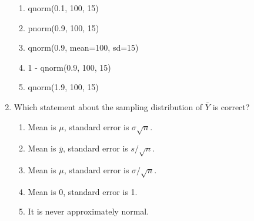 \documentclass{article}
\begin{document}
\begin{enumerate}
    \begin{enumerate}[label=\Alph*.]
        \item qnorm(0.1, 100, 15)
        \item pnorm(0.9, 100, 15)
        \item qnorm(0.9, mean=100, sd=15)
        \item 1 - qnorm(0.9, 100, 15)
        \item qnorm(1.9, 100, 15)
    \end{enumerate}
\item Which statement about the sampling distribution of $\bar Y$ is correct?
    \begin{enumerate}[label=\Alph*.]
        \item Mean is $\mu$, standard error is $\sigma\sqrt n$.
        \item Mean is $\bar y$, standard error is $s/\sqrt n$.
        \item Mean is $\mu$, standard error is $\sigma/\sqrt n$.
        \item Mean is 0, standard error is 1.
        \item It is never approximately normal.
    \end{enumerate}
\end{enumerate}

\newpage
\end{document}
